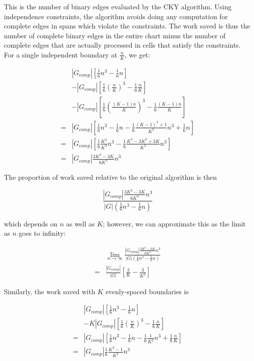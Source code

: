 \documentclass[11pt]{article}
\begin{document}
This is the number of binary edges evaluated by the CKY algorithm. Using
independence constraints, the algorithm avoids doing any computation for
complete edges in spans which violate the constraints. The work saved is thus
the number of complete binary edges in the entire chart minus the number of
complete edges that are actually processed in cells that satisfy the
constraints. For a single independent boundary at $\frac{n}{K}$, we get:

\begin{equation*}
\begin{split}
& |G_{comp}|[\frac{1}{6}n^3 - \frac{1}{6}n]\\& - |G_{comp}|[\frac{1}{6}(\frac{n}{K})^3 - \frac{1}{6}\frac{n}{K}]\\& - |G_{comp}|[\frac{1}{6}(\frac{(K-1)n}{K})^3 - \frac{1}{6}\frac{(K-1)n}{K}]\\
=& |G_{comp}|[\frac{1}{6}n^3 - \frac{1}{6}n - \frac{1}{6}\frac{(K-1)^3 +1}{K^3}n^3 + \frac{1}{6}n]\\
=& |G_{comp}|[\frac{1}{6}\frac{K^3}{K^3}n^3 - \frac{1}{6}\frac{K^3 - 3K^2 + 3K}{K^3}n^3]\\
=& |G_{comp}|\frac{3K^2 - 3K}{6K^3}n^3
\end{split}
\end{equation*}

The proportion of work saved relative to the original algorithm is then

\begin{equation*}
\frac{|G_{comp}|\frac{3K^2 - 3K}{6K^3}n^3}{|G|(\frac{1}{6}n^3 - \frac{1}{6}n)}
\end{equation*}

which depends on $n$ as well as $K$; however, we can approximate this as the limit
as $n$ goes to infinity:

\begin{equation*}
\begin{split}
& \lim_{n \to \infty}\frac{|G_{comp}|\frac{3K^2 - 3K}{6K^3}n^3}{|G|(\frac{1}{6}n^3 - \frac{1}{6}n)}\\
=& \frac{|G_{comp}|}{|G|}[\frac{3}{K} - \frac{3}{K^2}]
\end{split}
\end{equation*}

Similarly, the work saved with $K$ evenly-spaced boundaries is

\begin{equation*}
\begin{split}
& |G_{comp}|[\frac{1}{6}n^3 - \frac{1}{6}n]\\
& - K|G_{comp}|[\frac{1}{6}(\frac{n}{K})^3 - \frac{1}{6}\frac{n}{K}]\\
=& |G_{comp}|[\frac{1}{6}n^3 - \frac{1}{6}n - \frac{1}{6}\frac{1}{K^2}n^3 + \frac{1}{6}\frac{n}{K}]\\
=& |G_{comp}|\frac{1}{6}\frac{K^2-1}{K^2}n^3
\end{split}
\end{equation*}
\end{document}
